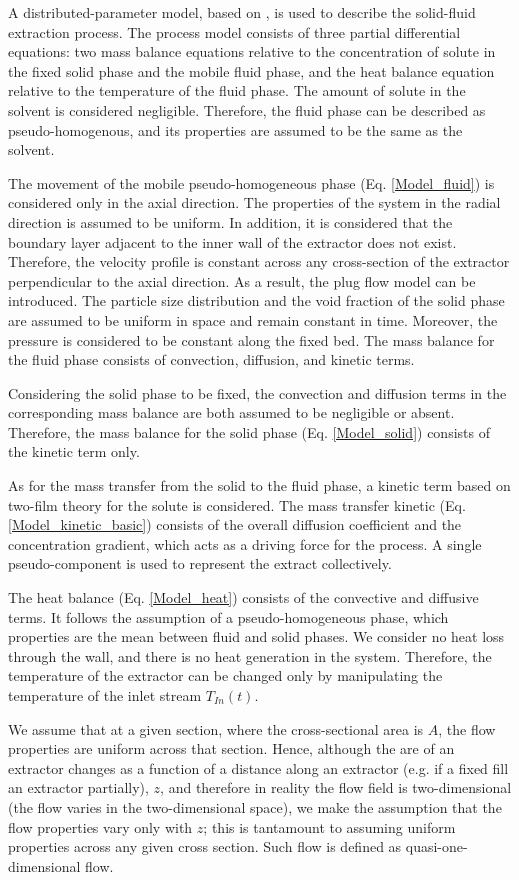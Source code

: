 \documentclass[../Parameter_fitting.tex]{subfiles}
\begin{document}
	{\color{blue}A distributed-parameter model, based on \citet{Reverchon1996}, is used to describe the solid-fluid extraction process. The process model consists of three partial differential equations: two mass balance equations relative to the concentration of solute in the fixed solid phase and the mobile fluid phase, and the heat balance equation relative to the temperature of the fluid phase. The amount of solute in the solvent is considered negligible. Therefore, the fluid phase can be described as pseudo-homogenous, and its properties are assumed to be the same as the solvent.
		
		The movement of the mobile pseudo-homogeneous phase (Eq. \ref{Model_fluid}) is considered only in the axial direction. The properties of the system in the radial direction is assumed to be uniform. In addition, it is considered that the boundary layer adjacent to the inner wall of the extractor does not exist. Therefore, the velocity profile is constant across any cross-section of the extractor perpendicular to the axial direction. As a result, the plug flow model can be introduced. The particle size distribution and the void fraction of the solid phase are assumed to be uniform in space and remain constant in time. Moreover, the pressure is considered to be constant along the fixed bed. The mass balance for the fluid phase consists of convection, diffusion, and kinetic terms.
		
		Considering the solid phase to be fixed, the convection and diffusion terms in the corresponding mass balance are both assumed to be negligible or absent. Therefore, the mass balance for the solid phase (Eq. \ref{Model_solid}) consists of the kinetic term only. 
		
		As for the mass transfer from the solid to the fluid phase, a kinetic term based on two-film theory for the solute is considered. The mass transfer kinetic (Eq. \ref{Model_kinetic_basic}) consists of the overall diffusion coefficient and the concentration gradient, which acts as a driving force for the process. A single pseudo-component is used to represent the extract collectively.
		
		The heat balance (Eq. \ref{Model_heat}) consists of the convective and diffusive terms. It follows the assumption of a pseudo-homogeneous phase, which properties are the mean between fluid and solid phases. We consider no heat loss through the wall, and there is no heat generation in the system. Therefore, the temperature of the extractor can be changed only by manipulating the temperature of the inlet stream $T_{In}(t)$.
		
		We assume that at a given section, where the cross-sectional area is $A$, the flow properties are uniform across that section. Hence, although the are of an extractor changes  as a function of a distance along an extractor (e.g. if a fixed fill an extractor partially), $z$, and therefore in reality the flow field is two-dimensional (the flow varies in the two-dimensional space), we make the assumption that the flow properties vary only with $z$; this is tantamount to assuming uniform properties across any given cross section. Such flow is defined as quasi-one-dimensional flow.
		
	}
	
\end{document}
